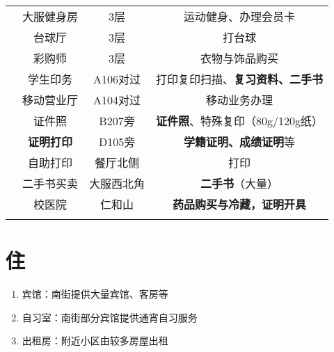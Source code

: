 \begin{table}[H]
\begin{tabular}{|c|c|c|c|}
        \cline{2-4}
                              & 大服健身房                                                     %
        \footnotemark %
                              & 3层            & 运动健身、办理会员卡                                \\
        \cline{2-4}
                              & 台球厅           & 3层         & 打台球                          \\
        \cline{2-4}
                              & 彩购师           & 3层         & 衣物与饰品购买                      \\
        \Xhline{1.2pt}
        \multirow{2}{*}{中和广场} & 学生印务          & A106对过     & 打印复印扫描、\textbf{复习资料、二手书}     \\
        \cline{2-4}
                              & 移动营业厅         & A104对过     & 移动业务办理                       \\
        \Xhline{1.2pt}
        \multirow{5}{*}{其他}   & 证件照           & B207旁      & \textbf{证件照}、特殊复印（80g/120g纸） \\
        \cline{2-4}
                              & \textbf{证明打印} & D105旁      & \textbf{学籍证明、成绩证明}等          \\
        \cline{2-4}
                              & 自助打印          & 餐厅北侧       & 打印                           \\
        \cline{2-4}
                              & 二手书买卖         & 大服西北角      & \textbf{二手书}（大量）             \\
        \cline{2-4}
                              & 校医院           & 仁和山        & \textbf{药品购买与冷藏，证明开具}        \\
        \Xhline{1.2pt}
    \end{tabular}
\end{table}

\section[住]{住}
\begin{enumerate}
    \item 宾馆：南街提供大量宾馆、客房等
    \item 自习室：南街部分宾馆提供通宵自习服务
    \item 出租房：附近小区由较多房屋出租\footnotemark
\end{enumerate}

